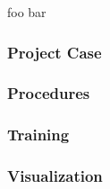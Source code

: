 foo bar

\subsubsection{\label{sec::ConceptProjectCase}Project Case}

\subsubsection{\label{sec::ConceptProcedures}Procedures}

\subsubsection{\label{sec::ConceptTraining}Training}

\subsubsection{\label{sec::ConceptVisualization}Visualization}

